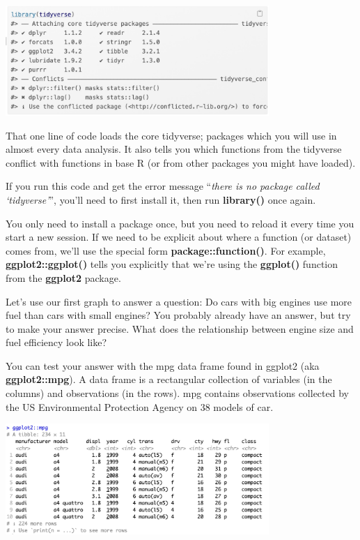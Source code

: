 \documentclass[
  letterpaper,
  DIV=11,
  numbers=noendperiod]{scrreprt}
\begin{document}
\includegraphics[width=0.75\textwidth,height=\textheight]{./images/Daily-2-Pic-1.jpg}

That one line of code loads the core tidyverse; packages which you will
use in almost every data analysis. It also tells you which functions
from the tidyverse conflict with functions in base R (or from other
packages you might have loaded).

If you run this code and get the error message ``\emph{there is no
package called `tidyverse'}'', you'll need to first install it, then run
\textbf{library()} once again.

You only need to install a package once, but you need to reload it every
time you start a new session. If we need to be explicit about where a
function (or dataset) comes from, we'll use the special form
\textbf{package::function()}. For example, \textbf{ggplot2::ggplot()}
tells you explicitly that we're using the \textbf{ggplot()} function
from the \textbf{ggplot2} package.

Let's use our first graph to answer a question: Do cars with big engines
use more fuel than cars with small engines? You probably already have an
answer, but try to make your answer precise. What does the relationship
between engine size and fuel efficiency look like?

You can test your answer with the mpg data frame found in ggplot2 (aka
\textbf{ggplot2::mpg}). A data frame is a rectangular collection of
variables (in the columns) and observations (in the rows). mpg contains
observations collected by the US Environmental Protection Agency on 38
models of car.

\includegraphics[width=0.75\textwidth,height=\textheight]{./images/Daily-2-Pic-2.jpg}
\end{document}
